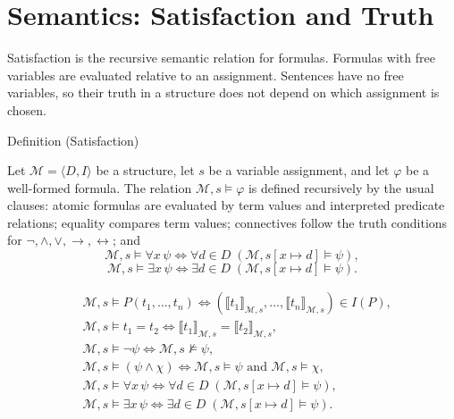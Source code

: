 
\section{Semantics: Satisfaction and Truth}

\begin{remark*}
Satisfaction is the recursive semantic relation for formulas. Formulas with
free variables are evaluated relative to an assignment. Sentences have no free
variables, so their truth in a structure does not depend on which assignment is
chosen.
\end{remark*}

\begin{definitionbox}{Definition (Satisfaction)}
\begin{definition}[Satisfaction]
\label{def:fol-satisfaction}
Let \(\mathcal M=\langle D,I\rangle\) be a structure, let \(s\) be a variable
assignment, and let \(\varphi\) be a well-formed formula. The relation
\(\mathcal M,s\models\varphi\) is defined recursively by the usual clauses:
atomic formulas are evaluated by term values and interpreted predicate
relations; equality compares term values; connectives follow the truth
conditions for \(\neg,\land,\lor,\to,\leftrightarrow\); and
\[
\mathcal M,s\models\forall x\,\psi
\Longleftrightarrow
\forall d\in D\;(\mathcal M,s[x\mapsto d]\models\psi),
\]
\[
\mathcal M,s\models\exists x\,\psi
\Longleftrightarrow
\exists d\in D\;(\mathcal M,s[x\mapsto d]\models\psi).
\]
\end{definition}
\end{definitionbox}

\begin{remark*}
\[
\begin{aligned}
&\mathcal M,s\models P(t_1,\ldots,t_n)
\Longleftrightarrow
(\llbracket t_1\rrbracket_{\mathcal M,s},\ldots,
\llbracket t_n\rrbracket_{\mathcal M,s})\in I(P),\\
&\mathcal M,s\models t_1=t_2
\Longleftrightarrow
\llbracket t_1\rrbracket_{\mathcal M,s}
=
\llbracket t_2\rrbracket_{\mathcal M,s},\\
&\mathcal M,s\models\neg\psi
\Longleftrightarrow
\mathcal M,s\not\models\psi,\\
&\mathcal M,s\models(\psi\land\chi)
\Longleftrightarrow
\mathcal M,s\models\psi \text{ and } \mathcal M,s\models\chi,\\
&\mathcal M,s\models\forall x\,\psi
\Longleftrightarrow
\forall d\in D\;(\mathcal M,s[x\mapsto d]\models\psi),\\
&\mathcal M,s\models\exists x\,\psi
\Longleftrightarrow
\exists d\in D\;(\mathcal M,s[x\mapsto d]\models\psi).
\end{aligned}
\]
\end{remark*}

